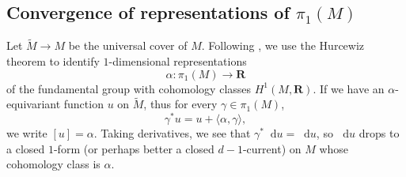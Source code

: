 \documentclass[reqno,11pt]{amsart}
\newcommand{\RR}{\mathbf{R}}
\newcommand*\dif{\mathop{}\!\mathrm{d}}
\theoremstyle{definition}
\numberwithin{equation}{section}
\begin{document}

\subsection{Convergence of representations of \texorpdfstring{$\pi_1(M)$}{the fundamental group}}
Let $\tilde M \to M$ be the universal cover of $M$.
Following \cite[\S4]{daskalopoulos2020transverse}, we use the Hurcewiz theorem to identify $1$-dimensional representations
$$\alpha: \pi_1(M) \to \RR$$
of the fundamental group with cohomology classes $H^1(M, \RR)$.
If we have an $\alpha$-equivariant function $u$ on $\tilde M$, thus for every $\gamma \in \pi_1(M)$,
$$\gamma^* u = u + \langle \alpha, \gamma\rangle,$$
we write $[u] = \alpha$.
Taking derivatives, we see that $\gamma^* \dif u = \dif u$, so $\dif u$ drops to a closed $1$-form (or perhaps better a closed $d-1$-current) on $M$ whose cohomology class is $\alpha$.
\end{document}
